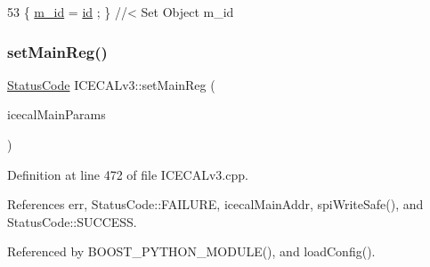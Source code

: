 \begin{DoxyCode}
53 \{ \hyperlink{classObject_aca74b9dbfed7b5556ea2d56c65b6b6b0}{m\_id}    = \hyperlink{classObject_af99145335cc61ff6e2798ea17db009d2}{id}    ; \} \textcolor{comment}{//< Set Object m\_id}
\end{DoxyCode}
\mbox{\label{classICECALv3_a479f7e17669da4b785af840049d39cb4}} 
\subsubsection{\texorpdfstring{set\+Main\+Reg()}{setMainReg()}}
{\footnotesize\ttfamily \hyperlink{classStatusCode}{Status\+Code} I\+C\+E\+C\+A\+Lv3\+::set\+Main\+Reg (\begin{DoxyParamCaption}\item[{Py\+Object $\ast$}]{icecal\+Main\+Params }\end{DoxyParamCaption})}



Definition at line 472 of file I\+C\+E\+C\+A\+Lv3.\+cpp.



References err, Status\+Code\+::\+F\+A\+I\+L\+U\+RE, icecal\+Main\+Addr, spi\+Write\+Safe(), and Status\+Code\+::\+S\+U\+C\+C\+E\+SS.



Referenced by B\+O\+O\+S\+T\+\_\+\+P\+Y\+T\+H\+O\+N\+\_\+\+M\+O\+D\+U\+L\+E(), and load\+Config().


